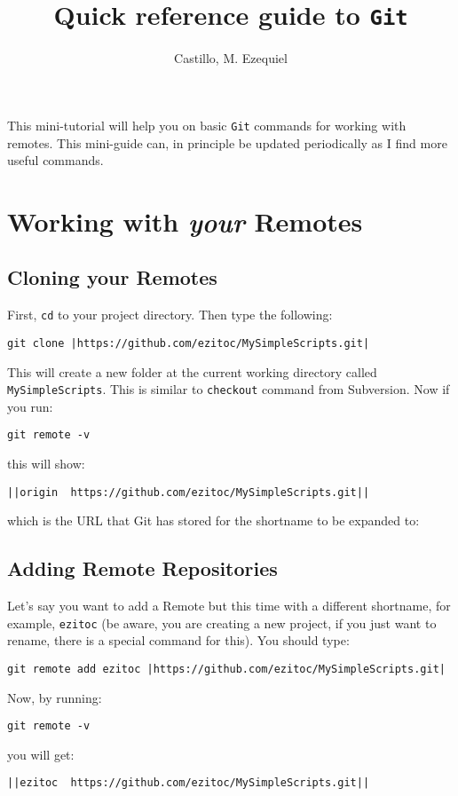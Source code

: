 \documentclass[a4paper,12pt]{article}
\begin{document}
\title{Quick reference guide to \texttt{Git}}
\date{}
\author{Castillo, M. Ezequiel}


\maketitle

This mini-tutorial will help you on basic \texttt{Git} commands for working
with remotes. This mini-guide can, in principle be updated periodically as I
find more useful commands.



\section{Working with \emph{your} Remotes}


\subsection{Cloning your Remotes}

First, \texttt{cd} to your project directory. Then type the following:
\begin{lstlisting}[style=input]
git clone |https://github.com/ezitoc/MySimpleScripts.git|
\end{lstlisting}
This will create a new folder at the current working directory called
\texttt{MySimpleScripts}.
This is similar to \texttt{checkout} command from Subversion.
Now if you run:
\begin{lstlisting}[style=input]
git remote -v
\end{lstlisting}
this will show:
\begin{lstlisting}[style=output]
||origin  https://github.com/ezitoc/MySimpleScripts.git||
\end{lstlisting}
which is the URL that Git has stored for the shortname to be
expanded to:

\subsection{Adding Remote Repositories}
Let's say you want to add a Remote but this time with a different shortname,
for example, \texttt{ezitoc} (be aware, you are creating a new project, if you
just want to rename, there is a special command for this).
You should type:
\begin{lstlisting}[style=input]
git remote add ezitoc |https://github.com/ezitoc/MySimpleScripts.git|
\end{lstlisting}
Now, by running:
\begin{lstlisting}[style=input]
git remote -v
\end{lstlisting}
you will get:
\begin{lstlisting}[style=output]
||ezitoc  https://github.com/ezitoc/MySimpleScripts.git||
\end{lstlisting}
\end{document}
